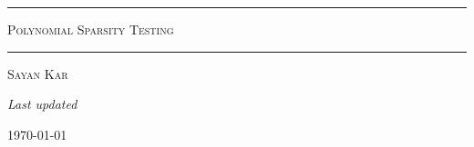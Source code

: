 %	
%	
%	
%	
%	
%	
%	

\begin{titlepage}
	\thispagestyle{empty}
	
	\begin{center}
		
		\vspace*{3cm}
		
			\rule{0.85\textwidth}{0.6pt}
		
		\vspace{1.5cm}
		
		
		{\fontsize{42}{50}\selectfont
			\textsc{Polynomial Sparsity Testing}\par}
		
		\vspace{1.2cm}
		
		\rule{0.85\textwidth}{0.6pt}
		
		\vspace{1.5cm}
		
		{\Large\textsc{Sayan Kar}\par}
		
	
		
		\vfill
		
		{\large
			\textit{Last updated}\par}
		
		\vspace{0.3cm}
		
		{\Large \today\par}
		
		\vspace*{1cm}
		
	\end{center}
\end{titlepage}